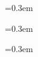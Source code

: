 \documentclass[11pt, a4paper]{russell}
\begin{document}
\makecvheader


\parskip=0.3em

\parskip=0.3em

\parskip=0.3em


\end{document}
